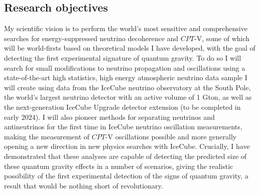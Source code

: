 \documentclass[a4paper,11pt]{article}
\begin{document}
\subsection{Research objectives}

My scientific vision is to perform the world's most sensitive and comprehensive searches for energy-suppressed neutrino decoherence and $CPT$-V, some of which will be world-firsts based on theoretical models I have developed, with the goal of detecting the first experimental signature of quantum gravity. To do so I will search for small modifications to neutrino propagation and oscillations using a state-of-the-art high statistics, high energy atmospheric neutrino data sample I will create using data from the IceCube neutrino observatory at the South Pole, the world's largest neutrino detector with an active volume of 1 Gton, as well as the next-generation IceCube Upgrade detector extension (to be completed in early 2024). I will also pioneer methods for separating neutrinos and antineutrinos for the first time in IceCube neutrino oscillation measurements, making the measurement of $CPT$-V oscillations possible and more generally opening a new direction in new physics searches with IceCube. Crucially, I have demonstrated that these analyses are capable of detecting the predicted size of these quantum gravity effects in a number of scenarios, giving the realistic possibility of the first experimental detection of the signs of quantum gravity, a result that would be nothing short of revolutionary. 
\end{document}
